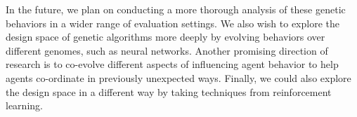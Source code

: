 In the future, we plan on conducting a more thorough analysis of these
genetic behaviors in a wider range of evaluation settings.
We also wish to explore the design space of genetic algorithms more deeply
by evolving behaviors over different genomes, such as neural networks.
Another promising direction of research is to co-evolve different aspects
of influencing agent behavior to help agents co-ordinate in previously
unexpected ways.
Finally, we could also explore the design space in a different way by
taking techniques from reinforcement learning.


